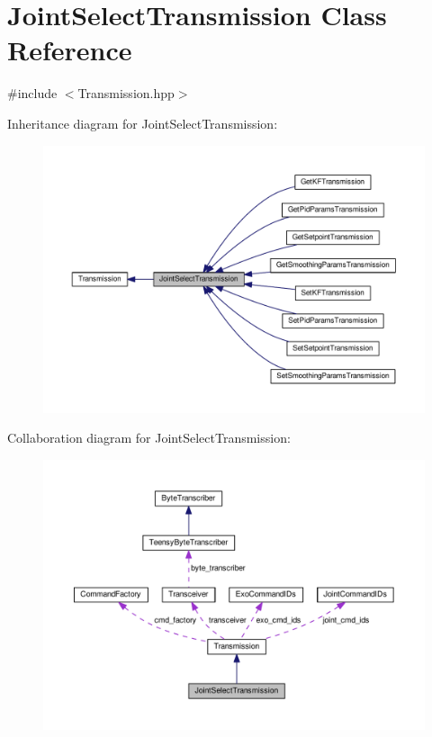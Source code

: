 \hypertarget{classJointSelectTransmission}{}\section{Joint\+Select\+Transmission Class Reference}
\label{classJointSelectTransmission}


{\ttfamily \#include $<$Transmission.\+hpp$>$}



Inheritance diagram for Joint\+Select\+Transmission\+:\nopagebreak
\begin{figure}[H]
\begin{center}
\leavevmode
\includegraphics[width=350pt]{classJointSelectTransmission__inherit__graph}
\end{center}
\end{figure}


Collaboration diagram for Joint\+Select\+Transmission\+:
\nopagebreak
\begin{figure}[H]
\begin{center}
\leavevmode
\includegraphics[width=350pt]{classJointSelectTransmission__coll__graph}
\end{center}
\end{figure}
